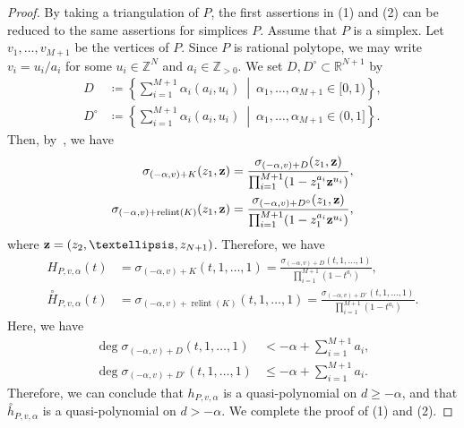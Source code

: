 \documentclass[10pt,a4paper]{amsart}
\theoremstyle{plain}
\theoremstyle{definition}
\theoremstyle{remark}
\begin{document}
\begin{proof}
By taking a triangulation of $P$, 
the first assertions in (1) and (2) can be reduced to the same assertions for simplices $P$. 
Assume that $P$ is a simplex. Let $v_1, \ldots, v_{M+1}$ be the vertices of $P$. 
Since $P$ is rational polytope, we may write $v_i = u_i / a_i$ for some $u_i \in \mathbb{Z}^N$ and $a_i \in \mathbb{Z}_{>0}$. 
We set $D, D^{\circ} \subset \mathbb{R}^{N+1}$ by
\begin{align*}
D &\coloneqq  \left\{ \sum _{i = 1}^{M+1}  \alpha _i (a_i, u_i) \ \middle | \ \alpha_1, \ldots, \alpha_{M+1} \in [0,1) \right\}, \\ 
D^{\circ} &\coloneqq  \left\{ \sum _{i = 1}^{M+1} \alpha _i (a_i, u_i) \ \middle | \ \alpha_1, \ldots, \alpha_{M+1} \in (0,1] \right\}.
\end{align*}
Then, by~\cite[Theorem 3.5]{BR}, we have 
\begin{align*}
\sigma _{(- \alpha, v) + K} (z_1, {\bf z}) 
&= \frac{\sigma _{(- \alpha, v) + D} (z_1, {\bf z})}{\prod _{i=1} ^{M+1} (1-z_1^{a_i} {\bf z}^{u_i})}, \\
\sigma _{(- \alpha, v) + \operatorname{relint}(K)} (z_1, {\bf z}) 
&= \frac{\sigma _{(- \alpha, v) + D^{\circ}} (z_1, {\bf z})}{\prod _{i=1} ^{M+1} (1-z_1^{a_i} {\bf z}^{u_i})}, 
\end{align*}
where ${\bf z} = (z_2, \ldots, z_{N+1})$. 
Therefore, we have 
\begin{align*}
H_{P,v,\alpha} (t) 
&= \sigma _{(- \alpha, v) + K} (t, 1, \ldots , 1) 
= \frac{\sigma _{(- \alpha, v) + D} (t, 1, \ldots, 1)}{\prod _{i=1} ^{M+1} (1- t^{a_i})}, \\
\overset{\circ}{H}_{P,v,\alpha} (t) 
&= \sigma _{(- \alpha, v) + \operatorname{relint}(K)} (t, 1, \ldots , 1) 
= \frac{\sigma _{(- \alpha, v) + D^{\circ}} (t, 1, \ldots, 1)}{\prod _{i=1} ^{M+1} (1- t^{a_i})}. 
\end{align*}
Here, we have 
\begin{align*}
\deg \sigma _{(- \alpha, v) + D} (t, 1, \ldots, 1) 
&< - \alpha + \sum _{i=1} ^{M+1} a_i, \\
\deg \sigma _{(- \alpha, v) + D^{\circ}} (t, 1, \ldots, 1) 
&\le - \alpha + \sum _{i=1} ^{M+1} a_i. 
\end{align*}
Therefore, we can conclude that $h_{P, v, \alpha}$ is a quasi-polynomial on $d \ge - \alpha$, and 
that $\overset{\circ}{h}_{P, v, \alpha}$ is a quasi-polynomial on $d > - \alpha$. 
We complete the proof of (1) and (2). 


\end{proof}
\end{document}

